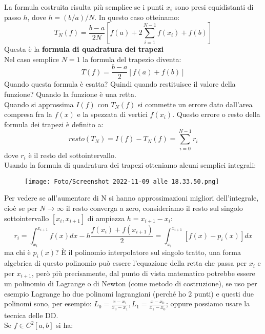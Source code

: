 \documentclass[a4paper, portrait]{book}
\numberwithin{equation}{chapter} %
\begin{document}
La formula costruita risulta più semplice se i punti $x_i$ sono presi equidistanti di passo $h$, dove $h = (b/a)/N$. In questo caso otteinamo:
\begin{equation}
    T_N(f) = \frac{b-a}{2N}[f(a) + 2\sum_{i=1}^{N-1}f(x_i)+f(b)]
\end{equation}
Questa è la \textbf{formula di quadratura dei trapezi}\\
Nel caso semplice $N = 1$ la formula del trapezio diventa:
\begin{equation}
    T(f) = \frac{b-a}{2}[f(a)+f(b)]
\end{equation}
Quando questa formula è esatta? Quindi quando restituisce il valore della funzione? Quando la funzione è una retta.\\
Quando si approssima $I(f)$ con $T_N(f)$ si commette un errore dato dall'area compresa fra la $f(x)$ e la spezzata di vertici $f(x_i)$. Questo errore o resto della formula dei trapezi è definito a:
\begin{equation}
    resto(T_N) = I(f) - T_N(f) = \sum_{i=0}^{N-1}r_i
\end{equation}
dove $r_i$ è il resto del sottointervallo.\\
Usando la formula di quadratura dei trapezi otteniamo alcuni semplici integrali:
\begin{figure}[h!]
    \centering
    \texttt{[image: Foto/Screenshot 2022-11-09 alle 18.33.50.png]}
    \caption{}
\end{figure}
Per vedere se all'aumentare di N si hanno approssimazioni migliori dell'integrale, cioè se per $N \rightarrow \infty$ il resto converga a zero, consideriamo il resto sul singolo sottointervallo $[x_i,x_{i+1}]$ di ampiezza $h = x_{i+1} - x_i$:
\begin{equation}
    r_i = \int_{x_i}^{x_{i+1}} f(x) dx - h \frac{f(x_i)+f(x_{i+1})}{2} = \int_{x_i}^{x_{i+1}} [f(x)-p_i(x)] dx
\end{equation}
ma chi è $p_i(x)$? È il polinomio interpolatore sul singolo tratto, una forma algebrica di questo polinomio può essere l'equazione della retta che passa per $x_i$ e per $x_{i+1}$, però più precisamente, dal punto di vista matematico potrebbe essere un polinomio di Lagrange o di Newton (come metodo di costruzione), se uso per esempio Lagrange ho due polinomi lagrangiani (perché ho 2 punti) e questi due polinomi sono, per esempio: $L_0 = \frac{x-x_1}{x_0-x_1}, L_1 = \frac{x-x_0}{x_1-x_0}$; oppure possiamo usare la tecnica delle DD.\\
Se $f \in C^2[a,b]$ si ha:
\end{document}
